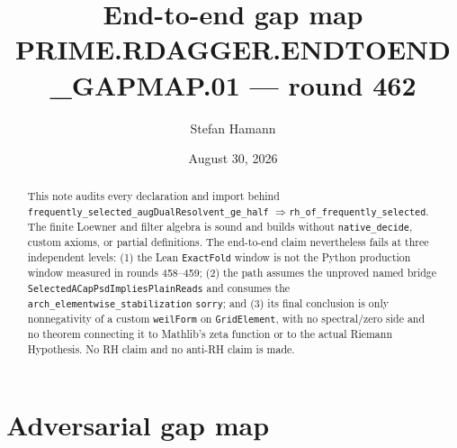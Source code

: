 \documentclass[10pt]{article}
\title{\bfseries End-to-end gap map\\[1mm]
\large PRIME.RDAGGER.ENDTOEND\_GAPMAP.01 --- round 462}
\author{Stefan Hamann}
\date{August 30, 2026}
\newcommand{\code}[1]{\nolinkurl{#1}}
\begin{document}
\maketitle

\begin{center}
\end{center}

\begin{abstract}
This note audits every declaration and import behind
\code{frequently_selected_augDualResolvent_ge_half}
$\Rightarrow$\code{rh_of_frequently_selected}.  The finite
Loewner and filter algebra is sound and builds without
\code{native_decide}, custom axioms, or partial definitions.
The end-to-end claim nevertheless fails at three independent levels:
(1) the Lean \code{ExactFold} window is not the Python production
window measured in rounds 458--459; (2) the path assumes the unproved
named bridge \code{SelectedACapPsdImpliesPlainReads} and consumes the
\code{arch_elementwise_stabilization} \code{sorry}; and (3) its final
conclusion is only nonnegativity of a custom \code{weilForm} on
\code{GridElement}, with no spectral/zero side and no theorem connecting
it to Mathlib's zeta function or to the actual Riemann Hypothesis.
No RH claim and no anti-RH claim is made.
\end{abstract}

\section{Adversarial gap map}
\end{document}
